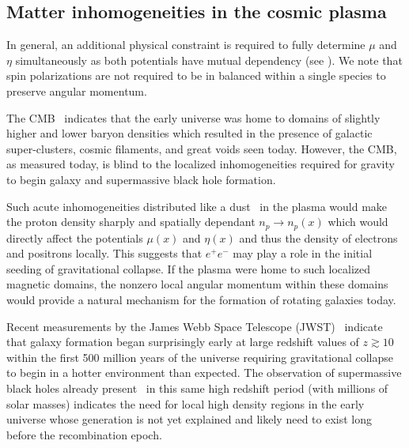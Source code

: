 \subsection{Matter inhomogeneities in the cosmic plasma}
\label{sec:inhomogeneous}
\noindent In general, an additional physical constraint is required to fully determine $\mu$ and $\eta$ simultaneously as both potentials have mutual dependency (see ). We note that spin polarizations are not required to be in balanced within a single species to preserve angular momentum.

The CMB~\citep{Planck:2018vyg} indicates that the early universe was home to domains of slightly higher and lower baryon densities which resulted in the presence of galactic super-clusters, cosmic filaments, and great voids seen today. However, the CMB, as measured today, is blind to the localized inhomogeneities required for gravity to begin galaxy and supermassive black hole formation.

Such acute inhomogeneities distributed like a dust~\citep{Grayson:2023flr} in the plasma would make the proton density sharply and spatially dependant $n_{p}\rightarrow n_{p}(x)$ which would directly affect the potentials $\mu(x)$ and $\eta(x)$ and thus the density of electrons and positrons locally. This suggests that $e^{+}e^{-}$ may play a role in the initial seeding of gravitational collapse. If the plasma were home to such localized magnetic domains, the nonzero local angular momentum within these domains would provide a natural mechanism for the formation of rotating galaxies today.

Recent measurements by the James Webb Space Telescope (JWST)~\citep{Yan:2022sxd,adams2023discovery,arrabal2023spectroscopic} indicate that galaxy formation began surprisingly early at large redshift values of $z\gtrsim10$ within the first 500 million years of the universe requiring gravitational collapse to begin in a hotter environment than expected. The observation of supermassive black holes already present~\citep{CEERSTeam:2023qgy} in this same high redshift period (with millions of solar masses) indicates the need for local high density regions in the early universe whose generation is not yet explained and likely need to exist long before the recombination epoch.
